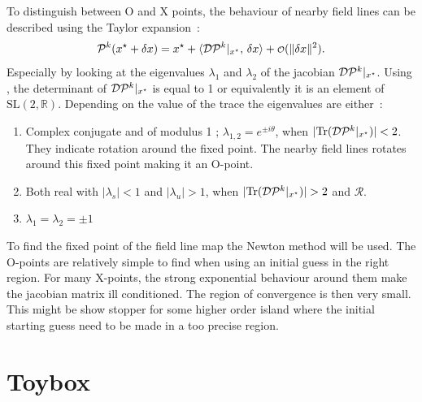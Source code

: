 To distinguish between O and X points, the behaviour of nearby field lines can be described using the Taylor expansion~:
\begin{equation*}
    \pmap^k(\z^\star+\delta \z) = \z^\star + \langle\dpmap^k\vert_{\z^\star},\, \delta\z\rangle + \smallO(\Vert\delta\z\Vert^2).
\end{equation*}
Especially by looking at the eigenvalues $\lambda_1$ and $\lambda_2$ of the jacobian $\mathcal{D}\mathcal{P}^k\vert_{x^\star}$. Using , the determinant of $\mathcal{D}\mathcal{P}^k\vert_{x^\star}$  is equal to 1 or equivalently it is an element of $\text{SL}(2,\mathbb{R})$. Depending on the value of the trace the eigenvalues are either~:
\begin{enumerate}
    \item Complex conjugate and of modulus 1 ; $\lambda_{1,2} = e^{\pm i\theta}$, when $\vert \text{Tr}(\mathcal{D}\mathcal{P}^k\vert_{x^\star})\vert < 2$. They indicate rotation around the fixed point. The nearby field lines rotates around this fixed point making it an O-point.
    \item Both real with $\vert\lambda_s\vert < 1$ and $\vert\lambda_u\vert > 1$, when $\vert \text{Tr}(\mathcal{D}\mathcal{P}^k\vert_{x^\star})\vert > 2$ and $\mathcal{R}$.
    \item $\lambda_1 = \lambda_2 = \pm 1$
\end{enumerate}

To find the fixed point of the field line map the Newton method will be used. The O-points are relatively simple to find when using an initial guess in the right region. For many X-points, the strong exponential behaviour around them make the jacobian matrix ill conditioned. The region of convergence is then very small. This might be show stopper for some higher order island where the initial starting guess need to be made in a too precise region.

\chapter{Toybox}\label{ch:toybox}

